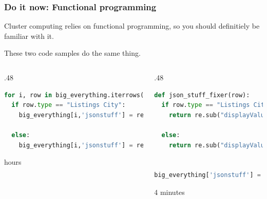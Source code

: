 \documentclass[10pt]{beamer}
\begin{document}
\begin{frame}[fragile]\frametitle{Do it now: Functional programming}

Cluster computing relies on functional programming, so you should definitiely be familiar with it.

These two code samples do the same thing.

\begin{columns}[T]
  \begin{column}{.48\textwidth}
  \begin{lstlisting}[language=Python]
for i, row in big_everything.iterrows():
  if row.type == "Listings City":
    big_everything[i,'jsonstuff'] = re.sub("displayValue\":(.*)\"", lambda m: case_fixer(m, True), row.jsonstuff)

  else:
    big_everything[i,'jsonstuff'] = re.sub("displayValue\":(.*)\"", lambda m: case_fixer(m, False), row.jsonstuff)

  \end{lstlisting}
   hours
  \end{column}

  \pause


  \begin{column}{.48\textwidth}
  \begin{lstlisting}[language=Python]
def json_stuff_fixer(row):
  if row.type == "Listings City":
    return re.sub("displayValue\":(.*)\"", lambda m: case_fixer(m, True), row.jsonstuff)

  else:
    return re.sub("displayValue\":(.*)\"", lambda m: case_fixer(m, False), row.jsonstuff)


big_everything['jsonstuff'] = big_everything.apply(json_stuff_fixer, axis=1)
  \end{lstlisting}
  \pause


  4 minutes
  \end{column}
  \end{columns}

\end{frame}
\end{document}
